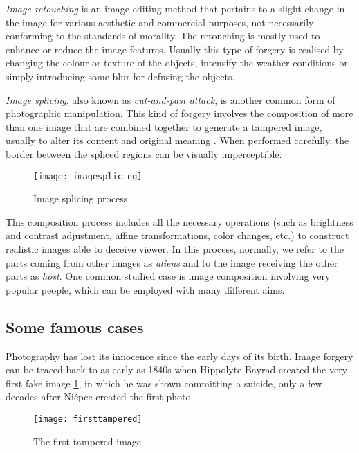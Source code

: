 \emph{Image retouching} is an image editing method that pertains to a slight change in the image for various aesthetic and commercial purposes, not necessarily conforming to the standards of morality. The retouching is mostly used to enhance or reduce the image features. Usually this type of forgery is realised by changing the colour or texture of the objects, intensify the weather conditions or simply
introducing some blur for defusing the objects.

\emph{Image splicing}, also known as \emph{cut-and-past attack}, is another common form of photographic manipulation. This kind of forgery involves the composition of more than one image that are combined together to generate a tampered image, usually to alter its content and original meaning \cite{qazi2013survey}\cite{piva2013overview}. When performed carefully, the border between the spliced regions can be visually imperceptible. 

\begin{figure}
  \centering
    \texttt{[image: imagesplicing]}
    \caption{Image splicing process}
\end{figure}

This composition process includes all the necessary operations (such as brightness and contrast adjustment, affine transformations, color changes, etc.) to construct realistic images able to deceive viewer. In this process, normally, we refer to the parts coming from other images as \emph{aliens} and to the image receiving the other parts as \emph{host}. One common studied case is image composition involving very popular people, which can be employed with many different aims.

\subsection{Some famous cases}

Photography has lost its innocence since the early days of its birth. Image forgery can be traced back to as early as 1840s when Hippolyte Bayrad created the very first fake image \ref{fig:firsttampered}, in which he was shown committing a suicide, only a few decades after Niépce created the first photo.

\begin{figure}[!h]
  \begin{center}
    \texttt{[image: firsttampered]}
  \end{center}
  \caption{The first tampered image}\label{fig:firsttampered}
\end{figure}

